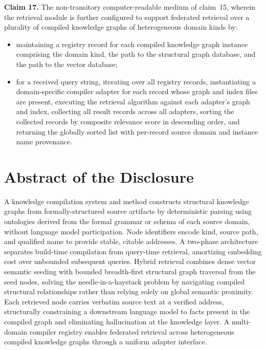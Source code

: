 \documentclass[12pt]{article}
\begin{document}
\bigskip
\noindent\textbf{Claim 17.}\quad
The non-transitory computer-readable medium of claim~15, wherein the retrieval
module is further configured to support federated retrieval over a plurality of
compiled knowledge graphs of heterogeneous domain kinds by:
\begin{itemize}[leftmargin=2.5em]
  \item maintaining a registry record for each compiled knowledge graph instance
    comprising the domain kind, the path to the structural graph database, and
    the path to the vector database;
  \item for a received query string, iterating over all registry records,
    instantiating a domain-specific compiler adapter for each record whose graph
    and index files are present, executing the retrieval algorithm against each
    adapter's graph and index, collecting all result records across all adapters,
    sorting the collected records by composite relevance score in descending
    order, and returning the globally sorted list with per-record source domain
    and instance name provenance.
\end{itemize}

\newpage
\section*{Abstract of the Disclosure}

A knowledge compilation system and method constructs structural knowledge graphs
from formally-structured source artifacts by deterministic parsing using
ontologies derived from the formal grammar or schema of each source domain,
without language model participation. Node identifiers encode kind, source path,
and qualified name to provide stable, citable addresses. A two-phase architecture
separates build-time compilation from query-time retrieval, amortizing embedding
cost over unbounded subsequent queries. Hybrid retrieval combines dense vector
semantic seeding with bounded breadth-first structural graph traversal from the
seed nodes, solving the needle-in-a-haystack problem by navigating compiled
structural relationships rather than relying solely on global semantic proximity.
Each retrieved node carries verbatim source text at a verified address,
structurally constraining a downstream language model to facts present in the
compiled graph and eliminating hallucination at the knowledge layer. A
multi-domain compiler registry enables federated retrieval across heterogeneous
compiled knowledge graphs through a uniform adapter interface.

\newpage


\end{document}
